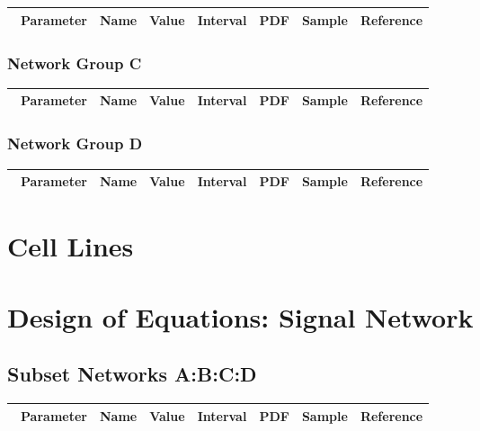 \documentclass[preprint, 8pt]{elsarticle}
\theoremstyle{definition}
\begin{document}
\begin{table}[H]\centering
\begin{tabular}{p{1cm}p{1cm}p{1cm}p{1cm}p{1cm}p{1cm}p{4cm}}\
Parameter & Name & Value & Interval & PDF & Sample & Reference \\
\hline
\hline
\end{tabular}
\end{table}

\subsubsection{Network Group C}

\begin{table}[H]\centering
\begin{tabular}{p{1cm}p{1cm}p{1cm}p{1cm}p{1cm}p{1cm}p{4cm}}\
Parameter & Name & Value & Interval & PDF & Sample & Reference \\
\hline
\hline
\end{tabular}
\end{table}

\subsubsection{Network Group D}

\begin{table}[H]\centering
\begin{tabular}{p{1cm}p{1cm}p{1cm}p{1cm}p{1cm}p{1cm}p{4cm}}\
Parameter & Name & Value & Interval & PDF & Sample & Reference \\
\hline
\hline
\end{tabular}
\end{table}

\section{Cell Lines}
\section{Design of Equations: Signal Network}
\subsection{Subset Networks A:B:C:D}

\begin{table}[H]\centering
\begin{tabular}{p{1cm}p{1cm}p{1cm}p{1cm}p{1cm}p{1cm}p{4cm}}\
Parameter & Name & Value & Interval & PDF & Sample & Reference \\
\hline
\hline
\end{tabular}
\end{table}
\end{document}
